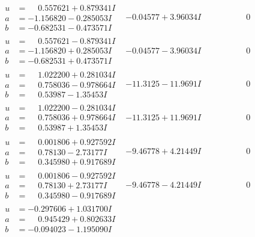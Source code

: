 \documentclass[1p]{elsarticle_modified}
\theoremstyle{definition}
\begin{document}
$$\begin{array}{c|c|c}
\begin{aligned}
u &= \phantom{-}0.557621 + 0.879341 I \\
a &= -1.156820 - 0.285053 I \\
b &= -0.682531 - 0.473571 I\end{aligned}
 & -0.04577 + 3.96034 I & \phantom{-0.000000 } 0 \\ \hline\begin{aligned}
u &= \phantom{-}0.557621 - 0.879341 I \\
a &= -1.156820 + 0.285053 I \\
b &= -0.682531 + 0.473571 I\end{aligned}
 & -0.04577 - 3.96034 I & \phantom{-0.000000 } 0 \\ \hline\begin{aligned}
u &= \phantom{-}1.022200 + 0.281034 I \\
a &= \phantom{-}0.758036 - 0.978664 I \\
b &= \phantom{-}0.53987 - 1.35453 I\end{aligned}
 & -11.3125 - 11.9691 I & \phantom{-0.000000 } 0 \\ \hline\begin{aligned}
u &= \phantom{-}1.022200 - 0.281034 I \\
a &= \phantom{-}0.758036 + 0.978664 I \\
b &= \phantom{-}0.53987 + 1.35453 I\end{aligned}
 & -11.3125 + 11.9691 I & \phantom{-0.000000 } 0 \\ \hline\begin{aligned}
u &= \phantom{-}0.001806 + 0.927592 I \\
a &= \phantom{-}0.78130 - 2.73177 I \\
b &= \phantom{-}0.345980 + 0.917689 I\end{aligned}
 & -9.46778 + 4.21449 I & \phantom{-0.000000 } 0 \\ \hline\begin{aligned}
u &= \phantom{-}0.001806 - 0.927592 I \\
a &= \phantom{-}0.78130 + 2.73177 I \\
b &= \phantom{-}0.345980 - 0.917689 I\end{aligned}
 & -9.46778 - 4.21449 I & \phantom{-0.000000 } 0 \\ \hline\begin{aligned}
u &= -0.297606 + 1.031700 I \\
a &= \phantom{-}0.945429 + 0.802633 I \\
b &= -0.094023 - 1.195090 I\end{aligned}

\end{array}$$
\end{document}

